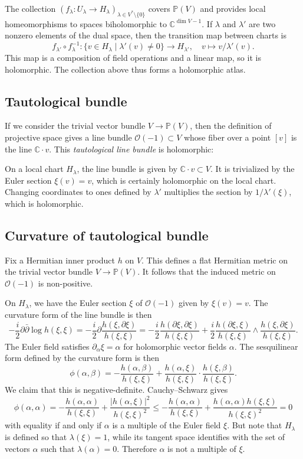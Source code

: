 \documentclass[11pt]{article}
\newcommand{\kk}[1]{\mathbb{#1}}
\newcommand{\cc}[1]{\mathcal{#1}}
\begin{document}
The collection $(f_\lambda : U_\lambda \to H_\lambda)_{\lambda \in V^* \setminus \{0\}}$ covers $\kk P(V)$ and provides local homeomorphisms to spaces biholomorphic to $\kk C^{\dim V - 1}$. If $\lambda$ and $\lambda'$ are two nonzero elements of the dual space, then the transition map between charts is
$$
f_{\lambda'} \circ f_{\lambda}^{-1} : \{v \in H_\lambda \mid \lambda'(v) \not= 0 \} \to H_{\lambda'},
\quad
v \mapsto v/\lambda'(v).
$$
This map is a composition of field operations and a linear map, so it is holomorphic. The collection above thus forms a holomorphic atlas.


\subsection{Tautological bundle}


If we consider the trivial vector bundle $V \to \kk P(V)$, then the definition of projective space gives a line bundle $\cc O(-1) \subset V$ whose fiber over a point $[v]$ is
the line $\kk C \cdot v$. This \emph{tautological line bundle} is holomorphic:

On a local chart $H_\lambda$, the line bundle is given by $\kk C \cdot v \subset V$. It is trivialized by the Euler section $\xi(v) = v$, which is certainly holomorphic on the local chart. Changing coordinates to ones defined by $\lambda'$ multiplies the section by $1/\lambda'(\xi)$, which is holomorphic.



\subsection{Curvature of tautological bundle}

Fix a Hermitian inner product $h$ on $V$. This defines a flat Hermitian metric on the trivial vector bundle $V \to \kk P(V)$. It follows that the induced metric on $\cc O(-1)$ is non-positive.

On $H_\lambda$, we have the Euler section $\xi$ of $\cc O(-1)$ given by $\xi(v) = v$. The curvature form of the line bundle is then
$$
-\frac i2 \partial \bar\partial \log h(\xi, \xi)
= -\frac i2\partial \frac{h(\xi, \partial \xi)}{h(\xi, \xi)}
= -\frac i2\frac{h(\partial \xi, \partial \xi)}{h(\xi, \xi)}
+ \frac i2\frac{h(\partial \xi, \xi)}{h(\xi, \xi)} \wedge \frac{h(\xi, \partial \xi)}{h(\xi, \xi)}.
$$
The Euler field satisfies $\partial_\alpha \xi = \alpha$ for holomorphic vector fields $\alpha$. The sesquilinear form defined by the curvature form is then
$$
\phi(\alpha, \beta)
= -\frac{h(\alpha, \beta)}{h(\xi, \xi)}
+ \frac{h(\alpha, \xi)}{h(\xi, \xi)} \cdot \frac{h(\xi, \beta)}{h(\xi, \xi)}.
$$
We claim that this is negative-definite. Cauchy--Schwarz gives
$$
\phi(\alpha, \alpha)
= -\frac{h(\alpha, \alpha)}{h(\xi, \xi)}
+ \frac{|h(\alpha, \xi)|^2}{h(\xi, \xi)^2}
\leq -\frac{h(\alpha, \alpha)}{h(\xi, \xi)}
+ \frac{h(\alpha, \alpha) h(\xi, \xi)}{h(\xi, \xi)^2}
= 0
$$
with equality if and only if $\alpha$ is a multiple of the Euler field $\xi$. But note that $H_\lambda$ is defined so that $\lambda(\xi) = 1$, while its tangent space identifies with the set of vectors $\alpha$ such that $\lambda(\alpha) = 0$. Therefore $\alpha$ is not a multiple of $\xi$.
\end{document}
